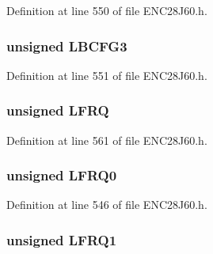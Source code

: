 Definition at line 550 of file E\+N\+C28\+J60.\+h.

\hypertarget{union_p_h_y_r_e_g_a6a5dc8665ab355e4b98b3900583c1fd1}{}
\subsubsection[{L\+B\+C\+F\+G3}]{\setlength{\rightskip}{0pt plus 5cm}unsigned L\+B\+C\+F\+G3}\label{union_p_h_y_r_e_g_a6a5dc8665ab355e4b98b3900583c1fd1}


Definition at line 551 of file E\+N\+C28\+J60.\+h.

\hypertarget{union_p_h_y_r_e_g_adc4d465d5ddb914b88bc5630745de6e3}{}
\subsubsection[{L\+F\+R\+Q}]{\setlength{\rightskip}{0pt plus 5cm}unsigned L\+F\+R\+Q}\label{union_p_h_y_r_e_g_adc4d465d5ddb914b88bc5630745de6e3}


Definition at line 561 of file E\+N\+C28\+J60.\+h.

\hypertarget{union_p_h_y_r_e_g_abbe2b84b1176dfadfcae9ac69372f8af}{}
\subsubsection[{L\+F\+R\+Q0}]{\setlength{\rightskip}{0pt plus 5cm}unsigned L\+F\+R\+Q0}\label{union_p_h_y_r_e_g_abbe2b84b1176dfadfcae9ac69372f8af}


Definition at line 546 of file E\+N\+C28\+J60.\+h.

\hypertarget{union_p_h_y_r_e_g_adca34511543e0211b32bc3f4700da5da}{}
\subsubsection[{L\+F\+R\+Q1}]{\setlength{\rightskip}{0pt plus 5cm}unsigned L\+F\+R\+Q1}\label{union_p_h_y_r_e_g_adca34511543e0211b32bc3f4700da5da}


